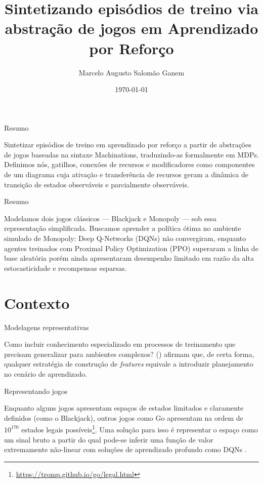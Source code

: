 \documentclass[aspectratio=169]{beamer}
\title{Sintetizando episódios de treino via abstração de jogos em Aprendizado por Reforço}
\author{Marcelo Augusto Salomão Ganem}
\institute{Departamento de Ciência da Computação \\ Universidade Federal de Minas Gerais}
\date{\today}
\begin{document}
\makeatletter

\begin{frame}
\titlepage
\end{frame}

\begin{frame}{Resumo}
    \begin{outline}
        \1 Sintetizar episódios de treino em aprendizado por reforço a partir de abstrações de jogos baseadas na sintaxe Machinations, traduzindo-as formalmente em MDPs. \\
        \1 Definimos nós, gatilhos, conexões de recursos e modificadores como componentes de um diagrama cuja ativação e transferência de recursos geram a dinâmica de transição de estados observáveis e parcialmente observáveis.
    \end{outline}
\end{frame}

\begin{frame}{Resumo}
    \begin{outline}
        \1 Modelamos dois jogos clássicos — Blackjack e Monopoly — sob essa representação simplificada.
        \1 Buscamos aprender a política ótima no ambiente simulado de Monopoly: Deep Q-Networks (DQNs) não convergiram, enquanto agentes treinados com Proximal Policy Optimization (PPO) superaram a linha de base aleatória porém ainda apresentaram desempenho limitado em razão da alta estocasticidade e recompensas esparsas.
    \end{outline}
\end{frame}


\section{Contexto}

\begin{frame}{Modelagens representativas}
    \begin{outline}
        \1 Como incluir conhecimento especializado em processos de treinamento que precisam generalizar para ambientes complexos?
        \1 \citeauthor{rl} (\citeyear{rl}) afirmam que, de certa forma, qualquer estratégia de construção de \textit{features} equivale a introduzir planejamento no cenário de aprendizado.
    \end{outline}
\end{frame}

\begin{frame}{Representando jogos}
    \begin{outline}
        \1 Enquanto alguns jogos apresentam espaços de estados limitados e claramente definidos (como o Blackjack), outros jogos como Go apresentam na ordem de $10^{170}$ estados legais possíveis\footnote{\url{https://tromp.github.io/go/legal.html}}.
        \1 Uma solução para isso é representar o espaço como um sinal bruto a partir do qual pode-se inferir uma função de valor extremamente não-linear com soluções de aprendizado profundo como DQNs \parencite{dqn}.
    \end{outline}
\end{frame}
\end{document}
